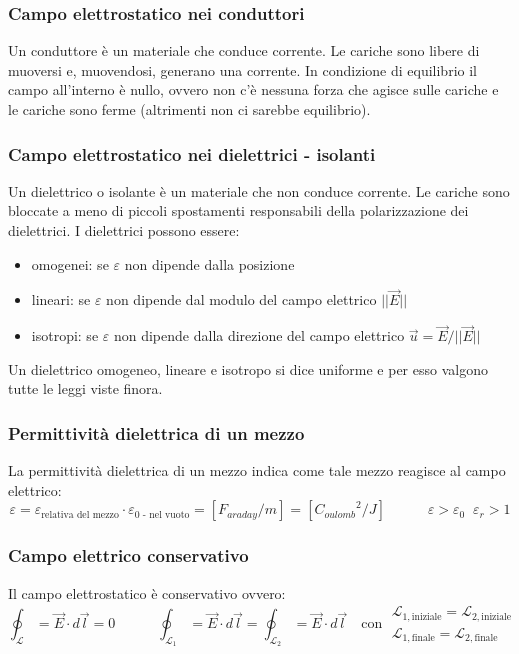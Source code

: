 \documentclass[a4paper]{article}
\begin{document}
\subsubsection*{Campo elettrostatico nei conduttori}
Un conduttore è un materiale che conduce corrente. Le cariche sono libere di muoversi e, muovendosi, generano una corrente. In
condizione di equilibrio il campo all'interno è nullo, ovvero non c'è nessuna forza che agisce sulle cariche e le cariche sono
ferme (altrimenti non ci sarebbe equilibrio).

\subsubsection*{Campo elettrostatico nei dielettrici - isolanti}
Un dielettrico o isolante è un materiale che non conduce corrente. Le cariche sono bloccate a meno di piccoli spostamenti responsabili
della polarizzazione dei dielettrici. I dielettrici possono essere:
\begin{itemize}
	\item omogenei: se \(\varepsilon\) non dipende dalla posizione
	\item lineari: se \(\varepsilon\) non dipende dal modulo del campo elettrico \(||\vec{E}||\)
	\item isotropi: se \(\varepsilon\) non dipende dalla direzione del campo elettrico \(\vec{u} = \vec{E} \big/ ||{\vec{E}}||\)
\end{itemize}
Un dielettrico omogeneo, lineare e isotropo si dice uniforme e per esso valgono tutte le leggi viste finora.

\subsubsection*{Permittività dielettrica di un mezzo}
La permittività dielettrica di un mezzo indica come tale mezzo reagisce al campo elettrico:
\[\varepsilon = \varepsilon_\text{relativa del mezzo} \cdot \varepsilon_\text{0 - nel vuoto} = [F_{araday}/m] = [{C_{oulomb}}^2/J] \qquad \quad \varepsilon > \varepsilon_0 \;\; \varepsilon_r > 1\]

\subsubsection*{Campo elettrico conservativo}
Il campo elettrostatico è conservativo ovvero:
\[\oint_\mathcal{L} = \vec{E} \cdot d\vec{l} = 0 \qquad \quad \oint_{\mathcal{L}_1} = \vec{E} \cdot d\vec{l} = \oint_{\mathcal{L}_2} = \vec{E} \cdot d\vec{l} \quad
\text{con} \; \begin{matrix} \mathcal{L}_{1,\text{iniziale}} = \mathcal{L}_{2,\text{iniziale}} \\ \mathcal{L}_{1,\text{finale}} = \mathcal{L}_{2,\text{finale}} \end{matrix}\]
\end{document}
